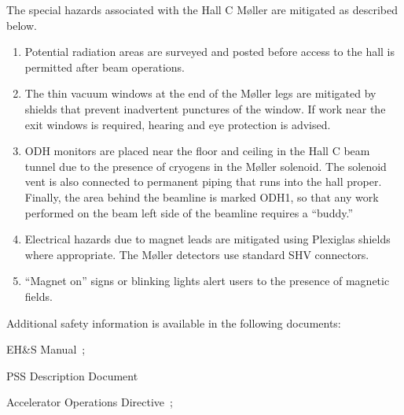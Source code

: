 {\begin{safetyen}{0}{0}

The special hazards associated with the Hall C M\o ller are mitigated as
described below.

\begin{enumerate}
        \item{Potential radiation areas are surveyed and posted before access to the hall is permitted
        after beam operations.}
        \item{The thin vacuum windows at the end of the M\o ller legs are mitigated by shields that prevent inadvertent
        punctures of the window. If work near the exit windows is required, hearing and eye protection is advised.}
        \item{ODH monitors are placed near the floor and ceiling in the Hall C beam tunnel due to the presence of cryogens
        in the M\o ller solenoid. The solenoid vent is also connected to permanent piping that runs into the hall proper.
        Finally, the area behind the beamline is marked ODH1, so that any work performed on the beam left side of the
        beamline requires a ``buddy.''}
        \item{Electrical hazards due to magnet leads are mitigated using Plexiglas shields where appropriate.
        The M\o ller detectors use standard SHV connectors.}
        \item{``Magnet on'' signs or blinking lights alert users to the presence of magnetic fields.}
\end{enumerate}

\noindent{}Additional safety information is available in the following documents:
\begin{list}{--}{\setlength{\itemsep}{-0.15cm}}
  \item EH\&S Manual~\cite{EHScebaf};
  \item PSS Description Document~\cite{PSScebaf}
  \item Accelerator Operations Directive~\cite{AODcebaf};
\end{list}



\end{safetyen}}
